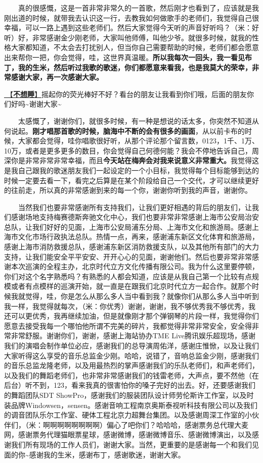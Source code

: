 \documentclass[]{ctexbook}
\begin{document}
  真的很感慨，这是一首非常非常久的一首歌，然后刚才也看到了，应该就是我刚出道的时候，就带我去认识这一行，去教我如何做歌手的老师们，我觉得自己很幸福，可以一路上遇到这些老师们。然后大家觉得今天听的声音好听吗？（米：好听）好，非常感谢金少刚老师，大家叫他师傅，叫他少爷。就很多时候，就我的性格大家都知道，不太会去打扰别人，但当你自己需要帮助的时候，老师们都会愿意出来帮你一把，你会觉得，哇，这世界真温暖。\textbf{所以我每次一回头，我一看见布丁，我的生米，然后听过我歌的歌迷，你们都愿意来看我，也是我莫大的荣幸，非常感谢大家，再一次感谢大家。}

\hyperref[donot-want-to-sleep]{🎵【\textbf{不想睡}】}摇起你的荧光棒好不好？看台的朋友让我看到你们哦，后面的朋友你们好吗\textasciitilde 谢谢大家\textasciitilde{}

  太感慨了，谢谢你们，就很多时候，有一种是想说的话太多，你突然不知道从何说起。\textbf{刚才唱那首歌的时候，脑海中不断的会有很多的画面}，从以前卡布的时候，大家都会觉得，哇你唱歌很好听，从那个评论那个留言数，0123，1千、1万、10万，或者是更多更多的数目，你会觉得自己何德何能？我会不停地告诉自己，周深你是非常非常非常幸福，而且\textbf{今天站在梅奔会对我来说意义非常重大。}我觉得这是我自己跟我的歌迷朋友我们一起设定的一个小目标，我觉得每个目标能够到达的时候一定要去看一下，看完之后算是在某个阶段给自己一个交代，才可以继续更好的往前走，所以真的非常感谢到来的每一个你，谢谢你听到我的声音，谢谢你。

  当然我们也要非常感谢所有支持我们，让我们更好相遇的背后的朋友们，让我们感谢场地支持梅赛德斯奔驰文化中心，我们也要非常非常感谢上海市公安局治安总队，让我们好好的见面，上海市公安局浦东分局、上海市文化和旅游局。感谢上海市文化市场行政执法总队。热情一点，再来，感谢浦东新区文化体育和旅游局，感谢上海市消防救援总队，感谢浦东新区消防救援支队，以及其他所有部门的大力支持，让我们能安全平平安安、开开心心的见面，谢谢他们。然后也要非常非常感谢本次巡演的全程主办，北京时代立方文化传播有限公司。我为什么这里要停顿，你们对这个名字熟悉吗？有熟悉的人都会知道，应该是从我自己第一个比较有点规模或者有点模样的巡演开始，就一直是在跟我们北京时代立方一起合作。就那个时候我就觉得，哇，你是怎么从那么多人当中看到我？就像你们从那么多人当中听到我一样，我觉得就每次，（米：你优秀）谢谢，谢谢，我不够优秀我不够优秀，我还可以更优秀，我再继续加油，但是就像刚才那个弹钢琴的片段一样，我觉得你们愿意去接受我每一个哪怕他所谓不完美的碎片，我都觉得非常非常安全，安全得非常非常舒服。谢谢你们，谢谢，感谢上海站协办TME Live腾讯娱乐超现场，感谢我们的演唱会制作单位必应，感谢我们的总导演周佑洋，感谢庄惟惞，以及让我们大家听得这么享受的音乐总监金少刚。哈哈，说错了，音响总监金少刚，感谢我们的音乐总监龙隆老师，以及用最热烈的掌声感谢我们的乐队老师们，和声老师们，以及我们的舞蹈老师们，也非常非常感谢我们的钱雷老师，大声点，要不然他（在后台）听不到，123，看来我真的很害怕你的嗓子完好的出去。好，还要感谢我们的舞蹈团队SDT ShowPro，感谢我们的服装团队设计师劳伦斯许工作室，以及时装品牌Windowsen，sensen。感谢音响工程南京奥斯泰视听科技有限公司以及我们的调音团队乐尔工作室、硬体工程北京力超舞台集团。以及感谢周深工作室的小伙伴们，（米：啊啊啊啊啊啊啊啊）偏心了吧你们？哈哈哈，感谢票务总代理大麦网，感谢票务代理猫眼票星球，感谢微博，感谢微博音乐、感谢微博演出，以及感谢我们所有现场的工作人员们，谢谢大家。当然，更重要的是感谢每一个和我们见面的你\textasciitilde 感谢我的生米，感谢布丁，感谢歌迷，谢谢大家。
\end{document}

